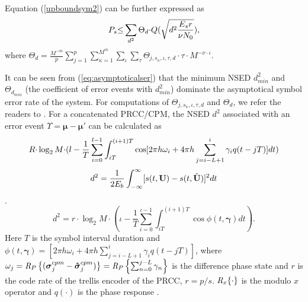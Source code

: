 \documentclass[12pt,twoside,onecolumn,a4paper,english]{IEEEtran2e}
\begin{document}
Equation (\ref{upboundsym2}) can be further expressed as
%
\begin{equation}\label{eq:asymptoticalser}\vspace{-1ex}%
P_s {\leq} \sum_{d^2}\Theta_d{\cdot}Q(\sqrt{d^2\frac{E_sr}{\nu
N_0}}),
\end{equation}
where \vspace{1ex}
$\Theta_d=
\frac{M^{-m}}{p}\sum_{j=1}^p\sum_{\kappa=1}^{M^m}\sum_{\iota}\sum_{\tau}{\Theta_{j,s_\kappa,\iota,\tau,d}}{\cdot}{\tau}{\cdot}M^{-\nu{\cdot}\iota}$.

It can be seen from (\ref{eq:asymptoticalser}) that the minimum
NSED $d_{min}^2$ and $\Theta_{d_{min}}$ (the coefficient
of error events with $d_{min}^2$) dominate %
the asymptotical symbol error rate of the system. For computations of $\Theta_{j,s_\kappa,\iota,\tau,d}$ and $\Theta_d$, we refer the readers to \cite{LinZihuai_PhDthesis,tcqcpmICC}. %
%
For a concatenated PRCC/CPM, the NSED $d^2$ associated with an
error event $\Upsilon=\boldsymbol{\mu}- \boldsymbol{\mu}'$ can be
calculated as
\begin{equation}\label{eq:d2}\vspace{-0ex}\footnotesize
R{\cdot}\log_2M{\cdot}
(l-\frac{1}{T}\sum_{i=0}^{l-1}\int_{iT}^{(i+1)T}\cos[2{\pi}h\omega_i+4{\pi}h\sum_{j=i-L+1}^{i}\gamma_iq(t-jT)]dt)
\end{equation}
\begin{equation*}\label{eq:d2}\vspace{-0ex}
d^2=\frac{1}{2E_b}\int_{-\infty}^\infty[s(t,\textbf{U})-s(t,\hat{\textbf{U}})]^2dt
\end{equation*}.
\begin{equation}\label{eq:d2}%
d^2=r{\cdot}\log_2M{\cdot}\left(\iota-\frac{1}{T}\sum_{i=0}^{\iota-1}\int_{iT}^{(i+1)T}\cos
\phi(t,{\boldsymbol{\gamma}})dt\right).
\end{equation}
Here $T$ is the symbol interval duration and
$\phi(t,{\boldsymbol{\gamma}})=[2{\pi}h\omega_i+4{\pi}h\sum_{j=i-L+1}^{i}\gamma_iq(t-jT)]$,
where
$\omega_j=\emph{R}_P\left\{({\boldsymbol{\sigma}}_j^{cpm}-{\boldsymbol{\hat\sigma}}_j^{cpm})\right\}=\emph{R}_P\left\{\sum_{n=0}^{j-L}\gamma_n\right\}$
is the difference phase state
and $r$ is the code rate of the trellis
encoder of the PRCC, $r=p/s$. %
$\emph{R}_x\{\cdot\}$ is the modulo $x$ operator and $q(\cdot)$ is
the phase response \cite{anderson}.
\end{document}
